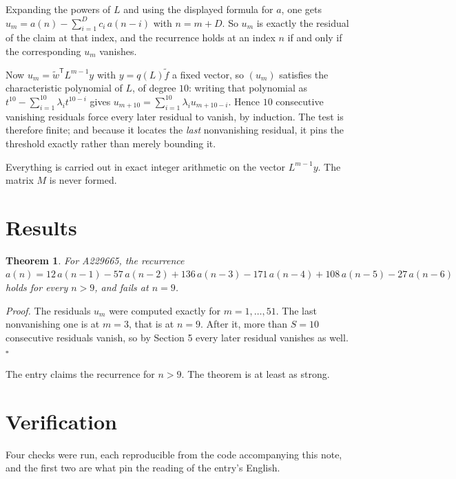 \documentclass[11pt]{article}
\newtheorem{theorem}{Theorem}
\theoremstyle{definition}
\begin{document}
Expanding the powers of $L$ and using the displayed formula for $a$, one gets $u_m = a(n) - \sum_{i=1}^{D} c_i\,a(n-i)$ with $n = m + D$. So $u_m$ is exactly the residual of the claim at that index, and the recurrence holds at an index $n$ if and only if the corresponding $u_m$ vanishes.

Now $u_m = \tilde w^{\mathsf T} L^{m-1} y$ with $y = q(L)\tilde f$ a fixed vector, so $(u_m)$ satisfies the characteristic polynomial of $L$, of degree $10$: writing that polynomial as $t^{10} - \sum_{i=1}^{10} \lambda_i t^{10-i}$ gives $u_{m+10} = \sum_{i=1}^{10} \lambda_i u_{m+10-i}$. Hence $10$ consecutive vanishing residuals force every later residual to vanish, by induction. The test is therefore finite; and because it locates the {\itshape last} nonvanishing residual, it pins the threshold exactly rather than merely bounding it.

Everything is carried out in exact integer arithmetic on the vector $L^{m-1}y$. The matrix $M$ is never formed.

\section{Results}

\begin{theorem} For A229665, the recurrence $a(n) = 12\,a(n-1) - 57\,a(n-2) + 136\,a(n-3) - 171\,a(n-4) + 108\,a(n-5) - 27\,a(n-6)$ holds for every $n > 9$, and fails at $n = 9$.\end{theorem}

{\itshape Proof.} The residuals $u_m$ were computed exactly for $m = 1,\dots,51$. The last nonvanishing one is at $m = 3$, that is at $n = 9$. After it, more than $S = 10$ consecutive residuals vanish, so by Section 5 every later residual vanishes as well. $\square$

The entry claims the recurrence for $n > 9$. The theorem is at least as strong.

\section{Verification}

Four checks were run, each reproducible from the code accompanying this note, and the first two are what pin the reading of the entry's English.
\end{document}
